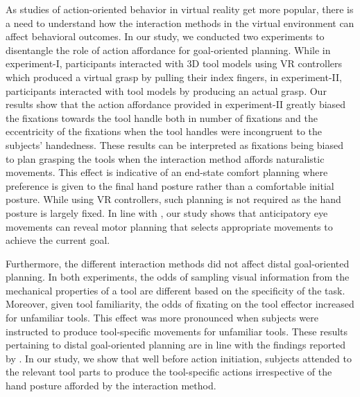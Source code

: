 As studies of action-oriented behavior in virtual reality get more popular, there is a need to understand how the interaction methods in the virtual environment can affect behavioral outcomes. In our study, we conducted two experiments to disentangle the role of action affordance for goal-oriented planning. While in experiment-I, participants interacted with 3D tool models using VR controllers which produced a virtual grasp by pulling their index fingers, in experiment-II, participants interacted with tool models by producing an actual grasp. Our results show that the action affordance provided in experiment-II greatly biased the fixations towards the tool handle both in number of fixations and the eccentricity of the fixations when the tool handles were incongruent to the subjects' handedness. These results can be interpreted as fixations being biased to plan grasping the tools when the interaction method affords naturalistic movements. This effect is indicative of an end-state comfort planning \citep{Rosenbaum1996-dq, Herbort2012-ma} where preference is given to the final hand posture rather than a comfortable initial posture. While using VR controllers, such planning is not required as the hand posture is largely fixed. In line with \citet{Pezzulo_undated-gx}, our study shows that anticipatory eye movements can reveal motor planning that selects appropriate movements to achieve the current goal.  

Furthermore, the different interaction methods did not affect distal goal-oriented planning. In both experiments, the odds of sampling visual information from the mechanical properties of a tool are different based on the specificity of the task. Moreover, given tool familiarity, the odds of fixating on the tool effector increased for unfamiliar tools. This effect was more pronounced when subjects were instructed to produce tool-specific movements for unfamiliar tools. These results pertaining to distal goal-oriented planning are in line with the findings reported by \citet{Belardinelli2016-xb}. In our study, we show that well before action initiation, subjects attended to the relevant tool parts to produce the tool-specific actions irrespective of the hand posture afforded by the interaction method.

